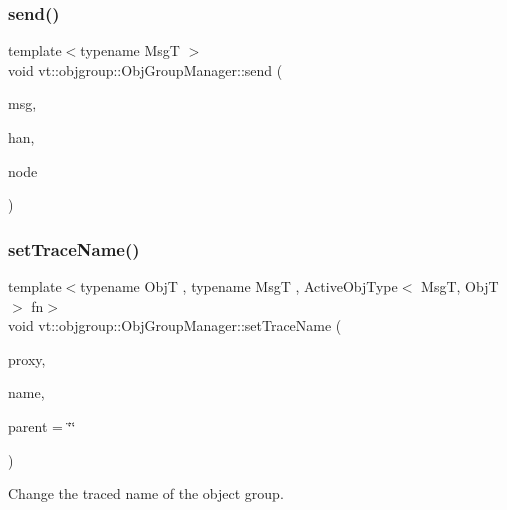 \subsubsection{\texorpdfstring{send()}{send()}\hspace{0.1cm}{\footnotesize\ttfamily [2/2]}}
{\footnotesize\ttfamily template$<$typename MsgT $>$ \\
void vt\+::objgroup\+::\+Obj\+Group\+Manager\+::send (\begin{DoxyParamCaption}\item[{\hyperlink{namespacevt_ab2b3d506ec8e8d1540aede826d84a239}{Msg\+Shared\+Ptr}$<$ MsgT $>$}]{msg,  }\item[{\hyperlink{namespacevt_af64846b57dfcaf104da3ef6967917573}{Handler\+Type}}]{han,  }\item[{\hyperlink{namespacevt_a866da9d0efc19c0a1ce79e9e492f47e2}{Node\+Type}}]{node }\end{DoxyParamCaption})}

\mbox{\label{structvt_1_1objgroup_1_1_obj_group_manager_a922a82ded79fdefb5fd7de60bde77aad}} 
\subsubsection{\texorpdfstring{set\+Trace\+Name()}{setTraceName()}}
{\footnotesize\ttfamily template$<$typename ObjT , typename MsgT , Active\+Obj\+Type$<$ Msg\+T, Obj\+T $>$ fn$>$ \\
void vt\+::objgroup\+::\+Obj\+Group\+Manager\+::set\+Trace\+Name (\begin{DoxyParamCaption}\item[{\hyperlink{structvt_1_1objgroup_1_1_obj_group_manager_aea65eef52f240a52210132eef5ce591f}{Proxy\+Type}$<$ ObjT $>$}]{proxy,  }\item[{std\+::string const \&}]{name,  }\item[{std\+::string const \&}]{parent = {\ttfamily \char`\"{}\char`\"{}} }\end{DoxyParamCaption})}



Change the traced name of the object group. 


